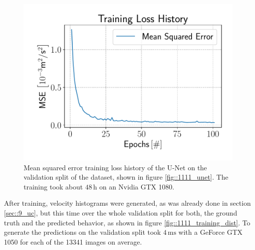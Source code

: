 \begin{figure}[h!]
	\centering
	\includegraphics[scale=.4]{chapters/11_autonomous_walking_experiments/img/05_07_19_loss_history.pdf}
	\caption{Mean squared error training loss history of the U-Net on the validation split of the dataset, shown in figure \ref{fig::1111_unet}. The training took about $48\,\text{h}$ on an Nvidia GTX 1080.}
	\label{fig::1111_loss}
\end{figure}
After training, velocity histograms were generated, as was already done in section \ref{sec::9_uc}, but this time over the whole validation split for both, the ground truth and the predicted behavior, as shown in figure \ref{fig::1111_training_dist}. To generate the predictions on the validation split took $4\,\text{ms}$ with a GeForce GTX 1050 for each of the 13341 images on average.
